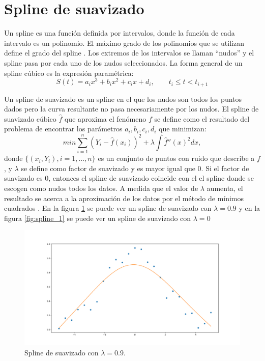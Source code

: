 \section{Spline de suavizado}\label{section:smoothing_splines}

Un spline es una función definida por intervalos, donde la función de cada intervalo es un polinomio. El máximo grado de los polinomios que se utilizan define el grado del spline \cite{ahlberg1967theory}. Los extremos de los intervalos se llaman ``nudos'' y el spline pasa por cada uno de los nudos seleccionados. La forma general de un spline cúbico es la expresión paramétrica:
$$S(t) = a_ix^3 + b_ix^2 + c_ix + d_i, \qquad t_i \leq t < t_{i+1}$$

Un spline de suavizado es un spline en el que los nudos son todos los puntos dados pero la curva resultante no pasa necesariamente por los nudos. El spline de suavizado cúbico $\hat{f}$ que aproxima el fenómeno $f$ se define como el resultado del problema de encontrar los parámetros $a_i, b_i, c_i, d_i$ que minimizan:
$$min \sum_{i=1}^n (Y_i - \hat{f}(x_i))^2 + \lambda \int \hat{f}''(x)^2 dx,$$
donde $\{(x_i, Y_i), i = 1, \dots, n\}$ es un conjunto de puntos con ruido que describe a $f$, y $\lambda$ se define como factor de suavizado y es mayor igual que 0. Si el factor de suavizado es 0, entonces el spline de suavizado coincide con el el spline donde se escogen como nudos todos los datos. A medida que el valor de $\lambda$ aumenta, el resultado se acerca a la aproximación de los datos por el método de mínimos cuadrados \cite{green1993nonparametric}. En la figura \ref{fig:spline_0.1} se puede ver un spline de suavizado con $\lambda=0.9$ y en la figura \ref{fig:spline_1} se puede ver un spline de suavizado con $\lambda=0$

\begin{figure}[h]
    \centering
    \includegraphics[width=\textwidth]{"figures/spline_0.1.pdf"}
    \caption{Spline de suavizado con $\lambda = 0.9$.}
    \label{fig:spline_0.1}
\end{figure}

